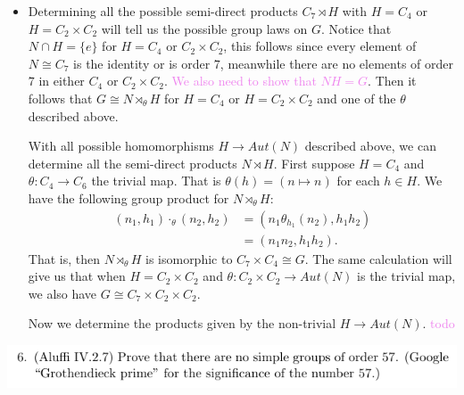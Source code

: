 \documentclass[12pt,letterpaper,boxed]{hmcpset}
\newcommand{\wg}[1]{\textcolor{violet}{#1}}
\begin{document}
\begin{solution}
\begin{itemize}
\item Determining all the possible semi-direct products $C_7 \rtimes
H$ with $H = C_4$ or $H = C_2 \times C_2$ will tell us the possible
group laws on $G$. Notice that $N \cap H = \{e \}$ for $H = C_4$ or
$C_2 \times C_2$, this follows since every element of $N \cong C_7$ is
the identity or is order $7$, meanwhile there are no elements of order
$7$ in either $C_4$ or $C_2 \times C_2$. 
\wg{We also need to show that $NH = G$}. 
Then it follows that $G \cong N \rtimes_\theta H$ for $H = C_4$ or $H
= C_2 \times C_2$ and one of the $\theta$ described above.

With all possible homomorphisms $H \to Aut(N)$ described above,
we can determine all the semi-direct products $N \rtimes H$.
First suppose $H = C_4$ and $\theta : C_4 \to C_6$ the trivial map.
That is $\theta(h) = (n \mapsto n)$ for each $h \in H$. We have the
following group product for $N \rtimes_\theta H$:
\begin{align*}
	(n_1, h_1) \cdot_\theta (n_2, h_2) 
		&= (n_1 \theta_{h_1}(n_2), h_1 h_2) \\
		&= (n_1 n_2, h_1 h_2).
\end{align*}
That is, then $N \rtimes_\theta H$ is isomorphic to $C_7 \times C_4
\cong G$.
The same calculation will give us that when $H = C_2 \times C_2$ and
$\theta : C_2 \times C_2 \to Aut(N)$ is the trivial map, we also have
$G \cong C_7 \times C_2 \times C_2$. 

Now we determine the products given by the non-trivial $H \to Aut(N)$.
\wg{todo}


\end{itemize}
\end{solution}

\newpage

\begin{problem}
	\includegraphics[scale=0.8]{6.png}
	\hfill
\end{problem}
\end{document}
